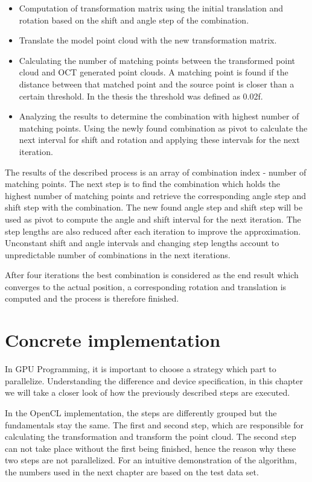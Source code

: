 \begin{itemize}
\item Computation of transformation matrix using the initial translation and rotation based on the shift and angle step of the combination.
\item Translate the model point cloud with the new transformation matrix. 
\item Calculating the number of matching points between the transformed point cloud and OCT generated point clouds. A matching point is found if the distance between that matched point and the source point is closer than a certain threshold. In the thesis the threshold was defined as 0.02f.
\item Analyzing the results to determine the combination with highest number of matching points. Using the newly found combination as pivot to calculate the next interval for shift and rotation and applying these intervals for the next iteration.
\end{itemize}

The results of the described process is an array of combination index - number of matching points.  The next step is to find the combination which holds the highest number of matching points and retrieve the corresponding angle step and shift step with the combination. The new found angle step and shift step will be used as pivot to compute the angle and shift interval for the next iteration. The step lengths are also reduced after each iteration to improve the approximation. Unconstant shift and angle intervals and changing step lengths account to unpredictable number of combinations in the next iterations. 

After four iterations the best combination is considered as the end result which converges to the actual position, a corresponding rotation and translation is computed and the process is therefore finished.

\section{Concrete implementation}
In GPU Programming, it is important to choose a strategy which part to parallelize. Understanding the difference and device specification, in this chapter we will take a closer look of how the previously described steps are executed.

In the OpenCL implementation, the steps are differently grouped but the fundamentals stay the same. The first and second step, which are responsible for calculating the transformation and transform the point cloud. The second step can not take place without the first being finished, hence the reason why these two steps are not parallelized. For an intuitive demonstration of the algorithm, the numbers used in the next chapter are based on the test data set.

